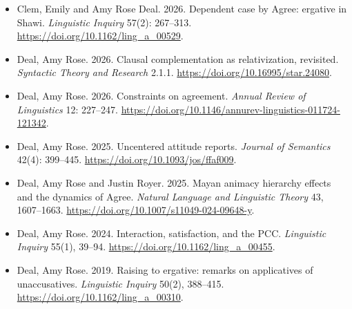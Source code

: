 \documentclass[12pt]{article}
\begin{document}
    \begin{itemize}[labelsep=.5cm,leftmargin=0cm,itemindent=0cm]






\item  Clem, Emily and Amy Rose Deal. 2026. {Dependent case by Agree: ergative in Shawi.}  \emph{Linguistic Inquiry} 57(2): 267--313. \href{
https://doi.org/10.1162/ling_a_00529}{https://doi.org/10.1162/ling\_a\_00529}. 


\item 
Deal, Amy Rose. 2026. Clausal complementation as relativization, revisited. \emph{Syntactic Theory and Research} 2.1.1.  \href{https://doi.org/10.16995/star.24080.}{https://doi.org/10.16995/star.24080}.


\item 
Deal, Amy Rose. 2026. Constraints on agreement. \emph{Annual Review of Linguistics} 12: 227--247. \href{https://doi.org/10.1146/annurev-linguistics-011724-121342}{https://doi.org/10.1146/annurev-linguistics-011724-121342}.

\item  
Deal, Amy Rose. 2025. {Uncentered attitude reports.} \emph{Journal of Semantics} 42(4): 399--445. \href{https://doi.org/10.1093/jos/ffaf009}{https://doi.org/10.1093/jos/ffaf009}. 


\item
Deal, Amy Rose and Justin Royer. 2025. Mayan animacy hierarchy effects and the dynamics of Agree. \emph{Natural Language and Linguistic Theory} 43, 1607--1663. \href{https://doi.org/10.1007/s11049-024-09648-y}{https://doi.org/10.1007/s11049-024-09648-y}.

\item  Deal, Amy Rose. 2024. Interaction, satisfaction, and the PCC.  \emph{Linguistic Inquiry}  55(1), 39--94. \href{https://doi.org/10.1162/ling_a_00455}{https://doi.org/10.1162/ling\_a\_00455}.

    \item \new  Deal, Amy Rose. 2019. {Raising to ergative: remarks on applicatives of unaccusatives.} \emph{Linguistic Inquiry} 50(2), 388--415. \href{https://doi.org/10.1162/ling_a_00310}{https://doi.org/10.1162/ling\_a\_00310}.
    

\end{itemize}
\end{document}
